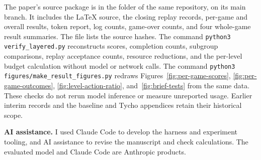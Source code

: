 The paper's source package is in the  folder of the same repository, on its main branch. It includes the LaTeX source, the closing replay records, per-game and overall results, token report, log counts, game-over counts, and four whole-game result summaries. The file  lists the source hashes. The command \texttt{python3 verify\_layered.py} reconstructs scores, completion counts, subgroup comparisons, replay acceptance counts, resource reductions, and the per-level budget calculation without model or network calls. The command \texttt{python3 figures/make\_result\_figures.py} redraws Figures~\ref{fig:per-game-scores}, \ref{fig:per-game-outcomes}, \ref{fig:level-action-ratio}, and~\ref{fig:brief-tests} from the same data. These checks do not rerun model inference or measure unreported usage. Earlier interim records and the baseline and Tycho appendices retain their historical scope.

\medskip
\noindent\textbf{AI assistance.} I used Claude Code to develop the harness and experiment tooling, and AI assistance to revise the manuscript and check calculations. The evaluated model and Claude Code are Anthropic products.
